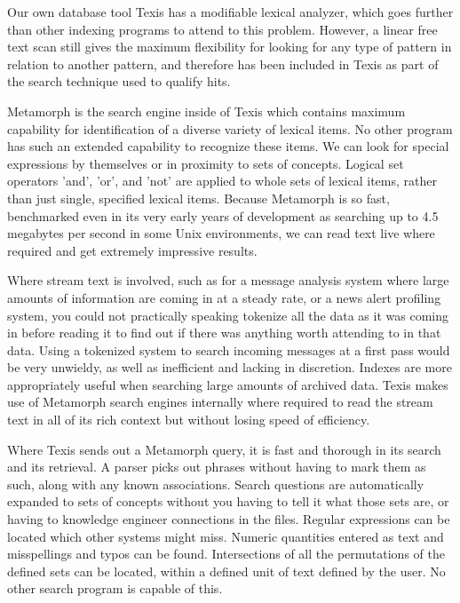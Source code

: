Our own database tool Texis has a modifiable lexical analyzer, which
goes further than other indexing programs to attend to this problem.
However, a linear free text scan still gives the maximum flexibility
for looking for any type of pattern in relation to another pattern,
and therefore has been included in Texis as part of the search
technique used to qualify hits.

Metamorph is the search engine inside of Texis which contains maximum
capability for identification of a diverse variety of lexical items.
No other program has such an extended capability to recognize these
items.  We can look for special expressions by themselves or in
proximity to sets of concepts.  Logical set operators 'and', 'or', and
'not' are applied to whole sets of lexical items, rather than just
single, specified lexical items.  Because Metamorph is so fast,
benchmarked even in its very early years of development as searching
up to 4.5 megabytes per second in some Unix environments, we can read
text live where required and get extremely impressive results.

Where stream text is involved, such as for a message analysis system
where large amounts of information are coming in at a steady rate, or
a news alert profiling system, you could not practically speaking
tokenize all the data as it was coming in before reading it to find
out if there was anything worth attending to in that data.  Using a
tokenized system to search incoming messages at a first pass would be
very unwieldy, as well as inefficient and lacking in discretion.
Indexes are more appropriately useful when searching large amounts of
archived data.  Texis makes use of Metamorph search engines internally
where required to read the stream text in all of its rich context but
without losing speed of efficiency.

Where Texis sends out a Metamorph query, it is fast and thorough in
its search and its retrieval.  A parser picks out phrases without
having to mark them as such, along with any known associations.
Search questions are automatically expanded to sets of concepts
without you having to tell it what those sets are, or having to
knowledge engineer connections in the files.  Regular expressions can
be located which other systems might miss.  Numeric quantities entered
as text and misspellings and typos can be found.  Intersections of all
the permutations of the defined sets can be located, within a defined
unit of text defined by the user.  No other search program is capable
of this.

